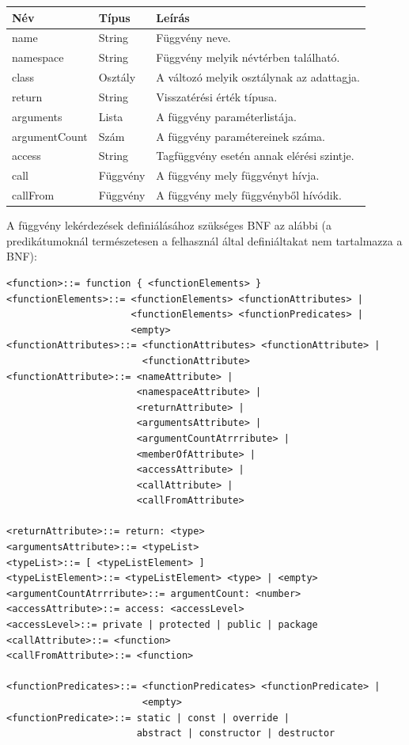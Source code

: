 \documentclass[a4paper,12pt]{report}
\begin{document}
\begin{center}
	\begin{tabular}{| l | l | l |}
		\hline
		Név & Típus & Leírás \\ \hline
		name & String & Függvény neve. \\ \hline
		namespace & String & Függvény melyik névtérben található. \\ \hline
		class & Osztály & A változó melyik osztálynak az adattagja. \\ \hline
		return & String & Visszatérési érték típusa. \\ \hline
		arguments & Lista & A függvény paraméterlistája. \\ \hline
		argumentCount & Szám & A függvény paramétereinek száma. \\ \hline
		access & String & Tagfüggvény esetén annak elérési szintje. \\ \hline
		call & Függvény & A függvény mely függvényt hívja. \\ \hline
		callFrom & Függvény & A függvény mely függvényből hívódik. \\ \hline
	\end{tabular}
\end{center}
A függvény lekérdezések definiálásához szükséges BNF az alábbi (a predikátumoknál természetesen a felhasznál által definiáltakat nem tartalmazza a BNF):
\begin{verbatim}
<function>::= function { <functionElements> }
<functionElements>::= <functionElements> <functionAttributes> | 
                      <functionElements> <functionPredicates> | 
                      <empty>
<functionAttributes>::= <functionAttributes> <functionAttribute> |
                        <functionAttribute>
<functionAttribute>::= <nameAttribute> | 
                       <namespaceAttribute> | 
                       <returnAttribute> | 
                       <argumentsAttribute> |
                       <argumentCountAtrrribute> | 
                       <memberOfAttribute> |
                       <accessAttribute> | 
                       <callAttribute> | 
                       <callFromAttribute>

<returnAttribute>::= return: <type>
<argumentsAttribute>::= <typeList>
<typeList>::= [ <typeListElement> ]
<typeListElement>::= <typeListElement> <type> | <empty>
<argumentCountAtrrribute>::= argumentCount: <number>
<accessAttribute>::= access: <accessLevel>
<accessLevel>::= private | protected | public | package
<callAttribute>::= <function>
<callFromAttribute>::= <function>

<functionPredicates>::= <functionPredicates> <functionPredicate> | 
                        <empty>
<functionPredicate>::= static | const | override | 
                       abstract | constructor | destructor
\end{verbatim}
\end{document}
